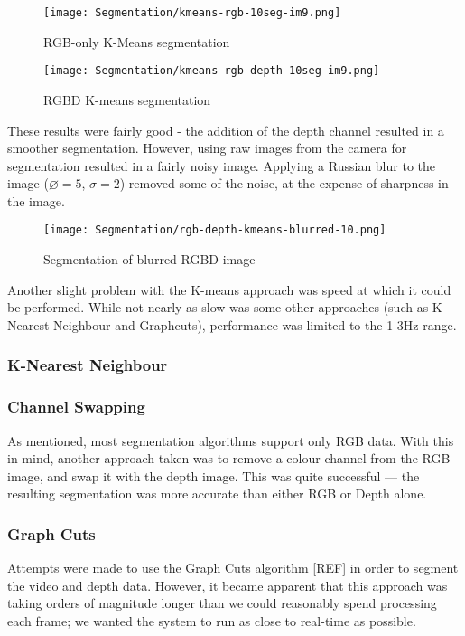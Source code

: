 \begin{figure}[H]
    \centering
    \texttt{[image: Segmentation/kmeans-rgb-10seg-im9.png]}
    \caption{RGB-only K-Means segmentation}
\end{figure}

\begin{figure}[H]
    \centering
    \texttt{[image: Segmentation/kmeans-rgb-depth-10seg-im9.png]}
    \caption{RGBD K-means segmentation}
\end{figure}

These results were fairly good - the addition of the depth channel resulted in a smoother segmentation. However, using raw images from the camera for segmentation resulted in a fairly noisy image. Applying a Russian blur to the image ($\diameter = 5$, $\sigma = 2$) removed some of the noise, at the expense of sharpness in the image.

\begin{figure}[H]
    \centering
    \texttt{[image: Segmentation/rgb-depth-kmeans-blurred-10.png]}
    \caption{Segmentation of blurred RGBD image}
\end{figure}

Another slight problem with the K-means approach was speed at which it could be performed. While not nearly as slow was some other approaches (such as K-Nearest Neighbour and Graphcuts), performance was limited to the 1-3Hz range.

\subsubsection{K-Nearest Neighbour}


\subsubsection{Channel Swapping}
As mentioned, most segmentation algorithms support only RGB data. With this in mind, another approach taken was to remove a colour channel from the RGB image, and swap it with the depth image. This was quite successful --- the resulting segmentation was more accurate than either RGB or Depth alone.

\subsubsection{Graph Cuts}
Attempts were made to use the Graph Cuts algorithm [REF] in order to segment the video and depth data. However, it became apparent that this approach was taking orders of magnitude longer than we could reasonably spend processing each frame; we wanted the system to run as close to real-time as possible.

